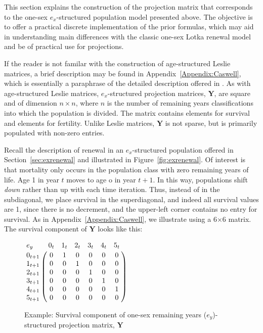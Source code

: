 \label{sec:ex1sexleslie}
This section explains the construction of the projection matrix that corresponds
to the one-sex $e_x$-structured population model presented above. The objective is
to offer a practical discrete implementation of the prior
formulas, which may aid in understanding main differences with the classic
one-sex Lotka renewal model and be of practical use for projections.

If the reader is not familar with the construction
of age-structured Leslie matrices, a brief description may be found in
Appendix~\ref{Appendix:Caswell}, which is essentially a paraphrase of the
detailed description offered in \cite{caswell2001matrix}. As with
age-structured Leslie matrices, $e_x$-structured projection matrices,
$\textbf{Y}$, are square and of dimension $n \times n$, where $n$ is the number
of remaining years classifications into which the population is divided. The matrix contains
elements for survival and elements for fertility. Unlike Leslie matrices,
$\textbf{Y}$ is not sparse, but is primarily populated with non-zero entries.

Recall the description of renewal in an $e_x$-structured population offered in
Section~\ref{sec:exrenewal} and illustrated in Figure~\ref{fig:exrenewal}. Of
interest is that mortality only occurs in the population class with zero
remaining years of life. Age 1 in year $t$ moves to age o in year $t+1$. In this
way, populations shift \textit{down} rather than up with each time iteration.
Thus, instead of in the subdiagonal, we place survival in the superdiagonal, and
indeed all survival values are 1, since there is no decrement, and the
upper-left corner contains no entry for survival. As in
Appendix~\ref{Appendix:Caswell}, we illustrate using a 6$\times$6 matrix. The
survival component of $\textbf{Y}$ looks like this:


\begin{figure}[h!]
\centering
\caption*{Example: Survival component of one-sex remaining years
($e_y$)-structured projection matrix, $\textbf{Y}$} 

$\bordermatrix{{e_y } & 0_t & 1_t & 2_t & 3_t & 4_t & 5_t\cr 
                0_{t+1} & 0    &  1   & 0    & 0    & 0    & 0   \cr
                1_{t+1} & 0    &  0   & 1    & 0    & 0    & 0   \cr 
                2_{t+1} & 0    &  0   & 0    & 1    & 0    & 0   \cr 
                3_{t+1} & 0    &  0   & 0    & 0    & 1    & 0   \cr 
                4_{t+1} & 0    &  0   & 0    & 0    & 0    & 1   \cr
                5_{t+1} & 0    &  0   & 0    & 0    & 0    & 0   }$
\end{figure}

